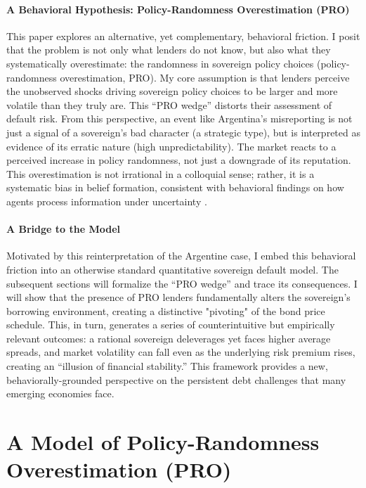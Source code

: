 \documentclass[12pt]{article}
\theoremstyle{plain}
\begin{document}
\paragraph{A Behavioral Hypothesis: Policy-Randomness Overestimation (PRO)}
This paper explores an alternative, yet complementary, behavioral friction. I
posit that the problem is not only what lenders do not know, but also what they
systematically overestimate: the randomness in sovereign policy choices
(policy-randomness overestimation, PRO). My core assumption is that lenders
perceive the unobserved shocks driving sovereign policy choices to be larger
and more volatile than they truly are. This ``PRO wedge'' distorts their
assessment of default risk. From this perspective, an event like Argentina's
misreporting is not just a signal of a sovereign's bad character (a strategic
type), but is interpreted as evidence of its erratic nature (high
unpredictability). The market reacts to a perceived increase in policy
randomness, not just a downgrade of its reputation. This overestimation is not
irrational in a colloquial sense; rather, it is a systematic bias in belief
formation, consistent with behavioral findings on how agents process
information under uncertainty \citep{TverskyKahneman1974, BarberisThaler2003}.

\paragraph{A Bridge to the Model}
Motivated by this reinterpretation of the Argentine case, I embed this
behavioral friction into an otherwise standard quantitative sovereign default
model. The subsequent sections will formalize the ``PRO wedge'' and trace its
consequences. I will show that the presence of PRO lenders fundamentally alters
the sovereign's borrowing environment, creating a distinctive "pivoting" of the
bond price schedule. This, in turn, generates a series of counterintuitive but
empirically relevant outcomes: a rational sovereign deleverages yet faces
higher average spreads, and market volatility can fall even as the underlying
risk premium rises, creating an ``illusion of financial stability.'' This
framework provides a new, behaviorally-grounded perspective on the persistent
debt challenges that many emerging economies face.

\section{A Model of Policy-Randomness Overestimation (PRO)}
\label{sec:model}
\end{document}
